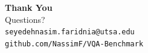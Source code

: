 \documentclass[aspectratio=169,t]{beamer}
\begin{document}
\begin{frame}[plain]
\begin{center}
  {\Large\bfseries Thank You}\\[12pt]
  {\large Questions?}\\[24pt]
  \texttt{seyedehnasim.faridnia@utsa.edu}\\[6pt]
  \texttt{github.com/NassimF/VQA-Benchmark}
\end{center}
\end{frame}

\end{document}
